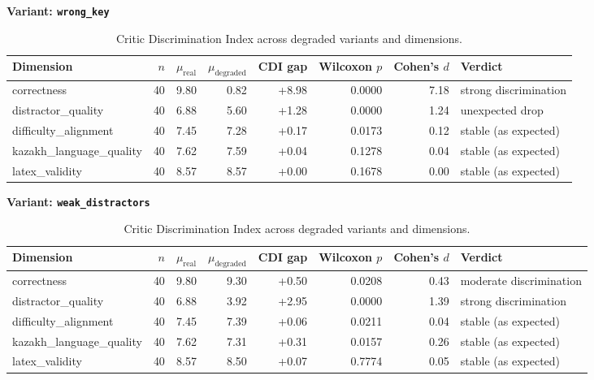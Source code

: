 \begin{table}[t]
\centering
\caption{Critic Discrimination Index across degraded variants and dimensions.}
\label{tab:cdi}
\vspace{0.5em}
\textbf{Variant: \texttt{wrong_key}}\\
\begin{tabular}{lrrrrrrl}
\hline
Dimension & $n$ & $\mu_\text{real}$ & $\mu_\text{degraded}$ & CDI gap & Wilcoxon $p$ & Cohen's $d$ & Verdict \\
\hline
correctness & 40 & 9.80 & 0.82 & +8.98 & 0.0000 & 7.18 & strong discrimination \\
distractor\_quality & 40 & 6.88 & 5.60 & +1.28 & 0.0000 & 1.24 & unexpected drop \\
difficulty\_alignment & 40 & 7.45 & 7.28 & +0.17 & 0.0173 & 0.12 & stable (as expected) \\
kazakh\_language\_quality & 40 & 7.62 & 7.59 & +0.04 & 0.1278 & 0.04 & stable (as expected) \\
latex\_validity & 40 & 8.57 & 8.57 & +0.00 & 0.1678 & 0.00 & stable (as expected) \\
\hline
\end{tabular}
\vspace{0.5em}
\textbf{Variant: \texttt{weak_distractors}}\\
\begin{tabular}{lrrrrrrl}
\hline
Dimension & $n$ & $\mu_\text{real}$ & $\mu_\text{degraded}$ & CDI gap & Wilcoxon $p$ & Cohen's $d$ & Verdict \\
\hline
correctness & 40 & 9.80 & 9.30 & +0.50 & 0.0208 & 0.43 & moderate discrimination \\
distractor\_quality & 40 & 6.88 & 3.92 & +2.95 & 0.0000 & 1.39 & strong discrimination \\
difficulty\_alignment & 40 & 7.45 & 7.39 & +0.06 & 0.0211 & 0.04 & stable (as expected) \\
kazakh\_language\_quality & 40 & 7.62 & 7.31 & +0.31 & 0.0157 & 0.26 & stable (as expected) \\
latex\_validity & 40 & 8.57 & 8.50 & +0.07 & 0.7774 & 0.05 & stable (as expected) \\
\hline
\end{tabular}
\end{table}
